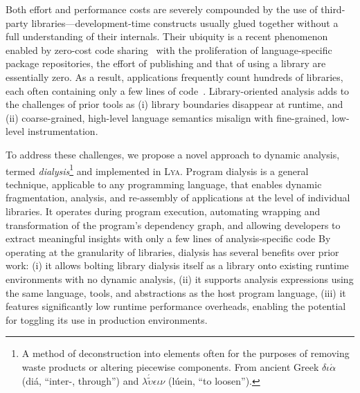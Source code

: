 \documentclass[letterpaper,twocolumn,10pt]{article}
\newcommand{\sys}{{\scshape Lya}\xspace}
\begin{document}
Both effort and performance costs are severely compounded by the use of third-party libraries---development-time constructs usually glued together without a full understanding of their internals.
Their ubiquity is a recent phenomenon enabled by zero-cost code sharing~\cite{libs}
  with the proliferation of language-specific package repositories, the effort of publishing and that of using a library are essentially zero.
As a result, applications frequently count hundreds of libraries, each often containing only a few lines of code~\cite{leftpad, npmstudy:19}. %
Library-oriented analysis adds to the challenges of prior tools as
  (i) library boundaries disappear at runtime, and
  (ii) coarse-grained, high-level language semantics misalign with fine-grained, low-level instrumentation.

To address these challenges, we propose a novel approach to dynamic analysis, termed \emph{dialysis}\footnote{
  A method of deconstruction into elements often for the purposes of removing waste products or altering piecewise components.
  From ancient Greek {\scriptsize $\delta\iota\acute{\alpha}$} (di\'{a}, ``inter-, through'') and {\scriptsize $\lambda\acute{\tilde{\upsilon}}\epsilon\iota\nu$} (lúein, ``to loosen'').
} and implemented in \sys.
Program dialysis is a general technique, applicable to any programming language, that enables dynamic fragmentation, analysis, and re-assembly of applications at the level of individual libraries. 
It operates during program execution, automating wrapping and transformation of the program's dependency graph, and allowing developers to extract meaningful insights with only a few lines of analysis-specific code
By operating at the granularity of libraries, dialysis has several benefits over prior work: %
  (i) it allows bolting library dialysis itself as a library onto existing runtime environments with no dynamic analysis,
  (ii) it supports analysis expressions using the same language, tools, and abstractions as the host program language,
  (iii) it features significantly low runtime performance overheads, enabling the potential for toggling its use in production environments.
\end{document}
